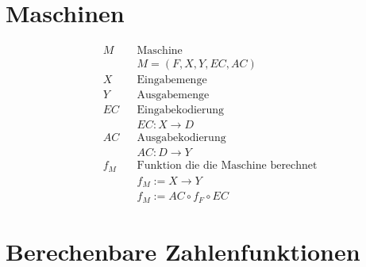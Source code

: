\documentclass[10pt,oneside,a4paper]{scrartcl}
\begin{document}
\section{Maschinen}

    \begin{align}
    &M   && \text{Maschine}\nonumber\\
            &&&M = (F, X, Y, EC, AC)\\
    &X   && \text{Eingabemenge}\nonumber\\
    &Y   && \text{Ausgabemenge}\nonumber\\
    &EC  && \text{Eingabekodierung}\nonumber\\
            &&&EC : X \longrightarrow D\\
    &AC  && \text{Ausgabekodierung}\nonumber\\
            &&&AC : D \longrightarrow Y\\
    &f_M && \text{Funktion die die Maschine berechnet}\nonumber\\
            &&&f_M := X \longrightarrow Y\\
            &&&f_M := AC \circ f_F \circ EC
    \end{align}

\section{Berechenbare Zahlenfunktionen}
\end{document}
